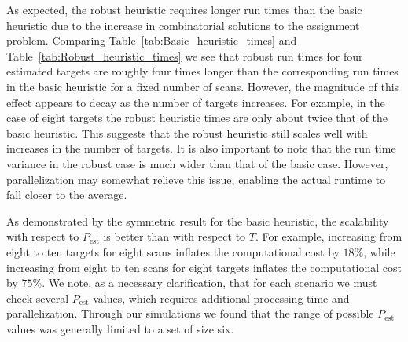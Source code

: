 As expected, the robust heuristic requires longer run times than the basic heuristic due to the increase in combinatorial solutions to the assignment problem. Comparing Table~\ref{tab:Basic_heuristic_times} and Table~\ref{tab:Robust_heuristic_times} we see that robust run times for four estimated targets are roughly four times longer than the corresponding run times in the basic heuristic for a fixed number of scans. However, the magnitude of this effect appears to decay as the number of targets increases. For example, in the case of eight targets the robust heuristic times are only about twice that of the basic heuristic. This suggests that the robust heuristic still scales well with increases in the number of targets. It is also important to note that the run time variance in the robust case is much wider than that of the basic case. However, parallelization may somewhat relieve this issue, enabling the actual runtime to fall closer to the average.

As demonstrated by the symmetric result for the basic heuristic, the scalability with respect to $P_{\text{est}}$ is better than with respect to $T$. For example, increasing from eight to ten targets for eight scans inflates the computational cost by $18\%$, while increasing from eight to ten scans for eight targets inflates the computational cost by $75\%$. We note, as a necessary clarification, that for each scenario we must check several $P_{\text{est}}$ values, which requires additional processing time and parallelization. Through our simulations we found that the range of possible $P_{\text{est}}$ values was generally limited to a set of size six. 

